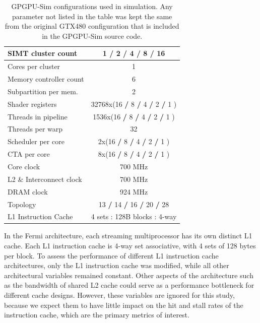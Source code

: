 \begin{table}[ht]
\caption{GTX580 Configuration in GPGPU-Sim}
\begin{tabular}{l|c}
\hline\hline
SIMT cluster count & 1 \textbf{/} 2 \textbf{/} 4 \textbf{/} 8 \textbf{/} 16  \\
\hline
Cores per cluster & 1 \\
\hline
Memory controller count & 6 \\
\hline
Subpartition per mem. & 2 \\ 
\hline
Shader registers & 32768x(16 \textbf{/} 8 \textbf{/} 4 \textbf{/} 2 \textbf{/} 1 ) \\
\hline
Threads in pipeline & 1536x(16 \textbf{/} 8 \textbf{/} 4 \textbf{/} 2 \textbf{/} 1 ) \\
\hline
Threads per warp & 32 \\
\hline
Scheduler per core & 2x(16 \textbf{/} 8 \textbf{/} 4 \textbf{/} 2 \textbf{/} 1 )\\
\hline
CTA per core & 8x(16 \textbf{/} 8 \textbf{/} 4 \textbf{/} 2 \textbf{/} 1 )\\
\hline
Core clock & 700 MHz\\
\hline
L2 \& Interconnect clock & 700 MHz\\
\hline
DRAM clock & 924 MHz\\
\hline
Topology & 13 \textbf{/} 14 \textbf{/} 16 \textbf{/} 20 \textbf{/} 28 \\
\hline
L1 Instruction Cache & 4 sets : 128B blocks : 4-way \\
\bottomrule[1pt]
\end{tabular}
\caption*{\textmd{GPGPU-Sim configurations used in simulation. Any parameter not listed in the table was kept the same from the original GTX480 configuration that is included in the GPGPU-Sim source code.}}
\label{table:gpuconfig}
\end{table}

In the Fermi architecture, each streaming multiprocessor has
its own distinct L1 cache. 
Each L1 instruction cache is 4-way set associative, with 4 sets of
128 bytes per block. 
To assess the  performance of different L1 instruction cache
architectures, only the L1 instruction cache was modified, while all
other architectural variables remained constant. 
Other aspects of the architecture such as the bandwidth of shared L2
cache could serve as a performance bottleneck for different cache
designs. 
However, these variables are ignored for this study, because we expect
them to have little impact on the hit and stall rates of the
instruction cache, which are the primary metrics of interest.


